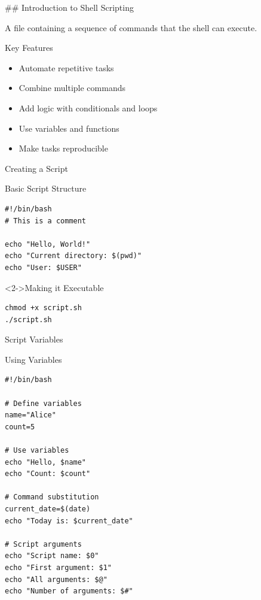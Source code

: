 \documentclass[presentation,aspectratio=1610]{beamer}
\begin{document}
\#\# Introduction to Shell Scripting
\begin{definition}\label{sec:org569f2d4}
A file containing a sequence of commands that the shell can execute.
\end{definition}
\begin{block}{Key Features}
\begin{itemize}
\item Automate repetitive tasks
\item Combine multiple commands
\item Add logic with conditionals and loops
\item Use variables and functions
\item Make tasks reproducible
\end{itemize}
\end{block}
\begin{frame}[label={sec:org1bec1ed},fragile]{Creating a Script}
 \begin{block}{Basic Script Structure}
\begin{verbatim}
#!/bin/bash
# This is a comment

echo "Hello, World!"
echo "Current directory: $(pwd)"
echo "User: $USER"
\end{verbatim}
\end{block}
\begin{exampleblock}<2->{Making it Executable}\label{sec:org4b25ad2}
\begin{verbatim}
chmod +x script.sh
./script.sh
\end{verbatim}
\end{exampleblock}
\end{frame}
\begin{frame}[label={sec:orgd792874},fragile]{Script Variables}
 \begin{block}{Using Variables}
\begin{verbatim}
#!/bin/bash

# Define variables
name="Alice"
count=5

# Use variables
echo "Hello, $name"
echo "Count: $count"

# Command substitution
current_date=$(date)
echo "Today is: $current_date"

# Script arguments
echo "Script name: $0"
echo "First argument: $1"
echo "All arguments: $@"
echo "Number of arguments: $#"
\end{verbatim}
\end{block}
\end{frame}
\end{document}
